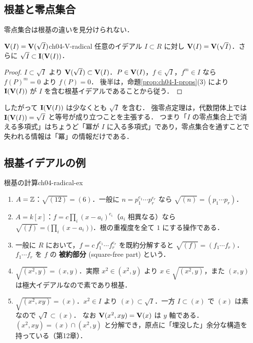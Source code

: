 \subsection{根基と零点集合}

零点集合は根基の違いを見分けられない．

\begin{myprop}{$\mathbf{V}(I)=\mathbf{V}(\sqrt I)$}{ch04-V-radical}
任意のイデアル $I\subset R$ に対し $\mathbf{V}(I)=\mathbf{V}(\sqrt I)$．さらに $\sqrt I\subset\mathbf{I}(\mathbf{V}(I))$．
\end{myprop}

\begin{proof}
$I\subset\sqrt I$ より $\mathbf{V}(\sqrt I)\subset\mathbf{V}(I)$．$P\in\mathbf{V}(I)$，$f\in\sqrt I$，$f^m\in I$ なら $f(P)^m=0$ より $f(P)=0$．
後半は，命題\ref{prop:ch04-I-props}(3) により $\mathbf{I}(\mathbf{V}(I))$ が $I$ を含む根基イデアルであることから従う．
\end{proof}

したがって $\mathbf{I}(\mathbf{V}(I))$ は少なくとも $\sqrt I$ を含む．
強零点定理は，代数閉体上では $\mathbf{I}(\mathbf{V}(I))=\sqrt I$ と等号が成り立つことを主張する．
つまり「$I$ の零点集合上で消える多項式」はちょうど「冪が $I$ に入る多項式」であり，零点集合を通すことで失われる情報は「冪」の情報だけである．

\subsection{根基イデアルの例}

\begin{myex}{根基の計算}{ch04-radical-ex}
\begin{enumerate}
  \item $A=\mathbb{Z}$：$\sqrt{(12)}=(6)$．一般に $n=p_1^{e_1}\cdots p_r^{e_r}$ なら $\sqrt{(n)}=(p_1\cdots p_r)$．
  \item $A=k[x]$：$f=c\prod_i(x-a_i)^{e_i}$（$a_i$ 相異なる）なら $\sqrt{(f)}=\bigl(\prod_i(x-a_i)\bigr)$．根の重複度を全て $1$ にする操作である．
  \item 一般に $R$ において，$f=c\,f_1^{e_1}\cdots f_r^{e_r}$ を既約分解すると $\sqrt{(f)}=(f_1\cdots f_r)$．$f_1\cdots f_r$ を $f$ の \textbf{被約部分} (square-free part) という．
  \item $\sqrt{(x^2,y)}=(x,y)$．実際 $x^2\in(x^2,y)$ より $x\in\sqrt{(x^2,y)}$，また $(x,y)$ は極大イデアルなので素であり根基．
  \item $\sqrt{(x^2,xy)}=(x)$．$x^2\in I$ より $(x)\subset\sqrt I$．一方 $I\subset(x)$ で $(x)$ は素なので $\sqrt I\subset(x)$．
        なお $\mathbf{V}(x^2,xy)=\mathbf{V}(x)$ は $y$ 軸である．$(x^2,xy)=(x)\cap(x^2,y)$ と分解でき，原点に「埋没した」余分な構造を持っている（第12章）．
\end{enumerate}
\end{myex}

